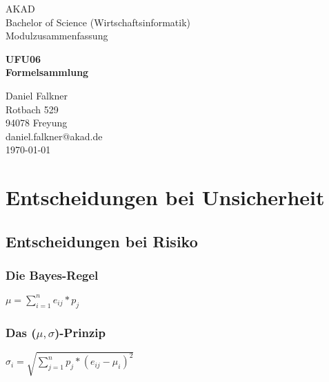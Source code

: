 \documentclass[a4paper,12pt]{scrartcl}
\begin{document}
\begin{titlepage}
\begin{small}
\vfill {AKAD\\ 
Bachelor of Science (Wirtschaftsinformatik) \\ 
Modulzusammenfassung}
\end{small}


\begin{center}
\begin{Large}
\vfill {\textsf{\textbf{
UFU06 \\
\vspace*{1cm} 
Formelsammlung
}}}
\end{Large}
\end{center}

\begin{small}
\vfill Daniel Falkner \\ Rotbach 529 \\  94078 Freyung \\  daniel.falkner@akad.de \\ 
\today
\end{small}

\end{titlepage}


\tableofcontents
\thispagestyle{empty}

\clearpage

\onehalfspacing

\pagestyle{plain}


\section{Entscheidungen bei Unsicherheit}
\subsection{Entscheidungen bei Risiko}
\subsubsection{Die Bayes-Regel}
$ \mu = \sum\limits_{i=1}^n e_{ij} * p_j $
\subsubsection{Das ($\mu, \sigma$)-Prinzip}
$ \sigma_i = \sqrt{\sum\limits_{j=1}^n p_j*(e_{ij} - \mu_i)^2}$
\end{document}
